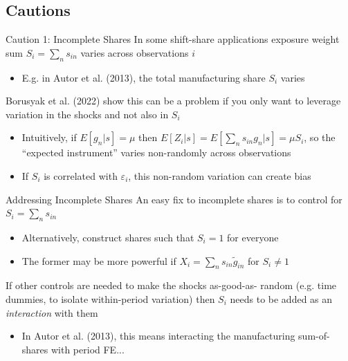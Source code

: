 \documentclass{beamer}
\begin{document}
\subsection{Cautions}
\begin{frame}{Caution 1: Incomplete Shares}
In some shift-share applications exposure weight sum $S_i=\sum_n s_{in}$ varies across observations $i$\smallskip
\begin{itemize}
\item E.g. in Autor et al. (2013), the total manufacturing share $S_i$ varies
\end{itemize}\medskip\pause{}
Borusyak et al. (2022) show this can be a problem if you only want to leverage variation in the shocks and not also in $S_i$ \smallskip
\begin{itemize}
\item Intuitively, if $E[g_n|s]=\mu$ then $E[Z_i|s]=E\left[\sum_n s_{in}g_n|s\right]=\mu S_i$, so the ``expected instrument'' varies non-randomly across observations\smallskip
\item If $S_i$ is correlated with $\varepsilon_i$, this non-random variation can create bias
\end{itemize}
\end{frame}

\begin{frame}{Addressing Incomplete Shares}
An easy fix to incomplete shares is to control for $S_i=\sum_n s_{in}$\smallskip
\begin{itemize}
\item Alternatively, construct shares such that $S_i=1$ for everyone\smallskip
\item The former may be more powerful if $X_i=\sum_n s_{in} \tilde{g}_{in}$ for $S_i\neq 1$
\end{itemize}\medskip\pause{}
If other controls are needed to make the shocks as-good-as- random (e.g. time dummies, to isolate within-period variation) then $S_i$ needs to be added as an \emph{interaction} with them\smallskip
\begin{itemize}
\item In Autor et al. (2013), this means interacting the manufacturing sum-of-shares with period FE...
\end{itemize}
\end{frame}
\end{document}
